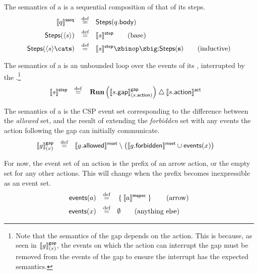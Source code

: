 \begin{defn}[\msubsequence]

The semantics of a \msubsequence{} is a sequential composition of that of its steps.
%
\begin{align*}
	\sseqsema{\asseq}
	\quad\defeq\quad&	
	\mathsf{Steps}(\field{\asseq}{body})
\\
	\mathsf{Steps}(\langle\astep\rangle)
	\quad\defeq\quad&	
	\stepsema{\astep}
	\tag{base}
\\
	\mathsf{Steps}(\langle\astep\rangle\cat\mathbf{\astep})
	\quad\defeq\quad&	
	\stepsema{\astep} \circseq \mathsf{Steps}(\mathbf{\astep})
	\tag{inductive}
\end{align*}

\end{defn}

\begin{defn}[\msequencestep]

The semantics of a \msequencestep{} is an unbounded loop over the events of its
\msequencegap, interrupted by the \msequenceaction.\footnote{Note that the semantics of the gap depends
on the action.  This is because, as seen in \(\llbracket g \rrbracket^{\mathsf{gap}}_{(x)}\),
the events on which the action can interrupt the
gap must be removed from the events of the gap to ensure the interrupt has the
expected semantics.}
%
\begin{align*}
	\llbracket s \rrbracket^{\mathsf{step}}
\quad\mathbin{\overset{\text{def}}=}\quad&	
	\operatorname{\mathbf{Run}}\left(\llbracket s.\mathsf{gap} \rrbracket^{\mathsf{gap}}_{(s.\mathsf{action})}\right)
	\mathbin{\triangle} \llbracket s.\mathsf{action} \rrbracket^{\mathsf{act}}
\end{align*}
\end{defn}

\begin{defn}[\msequencegap]
	The semantics of a \msequencegap{} is the CSP event set corresponding to
	the difference between the \emph{allowed} set,
	and the result of extending the \emph{forbidden} set with any events
	the action following the gap can initially communicate.
%
\begin{align*}
	\llbracket 
		g
	 \rrbracket^{\mathsf{gap}}_{(x)}
\quad\mathbin{\overset{\text{def}}=}\quad&
	\llbracket g.\mathsf{allowed} \rrbracket^{\mathsf{mset}}
	\setminus
	\left(\llbracket g.\mathsf{forbidden} \rrbracket^{\mathsf{mset}} \cup \mathsf{events}(x)\right)
\end{align*}
\end{defn}

\begin{defn}
For now, the event set of an action is the prefix of an arrow action, or
the empty set for any other actions.  This will change when the prefix becomes
inexpressible as an event set.
%
\begin{align*}
	\mathsf{events}(a)
	\quad\mathbin{\overset{\text{def}}=}\quad&
	\Set{\llbracket a\rrbracket^{\mathsf{mspec}}}
	\tag{arrow}
\\
	\mathsf{events}(x)
	\quad\mathbin{\overset{\text{def}}=}\quad&
	\emptyset
	\tag{anything else}
\end{align*}
\end{defn}

